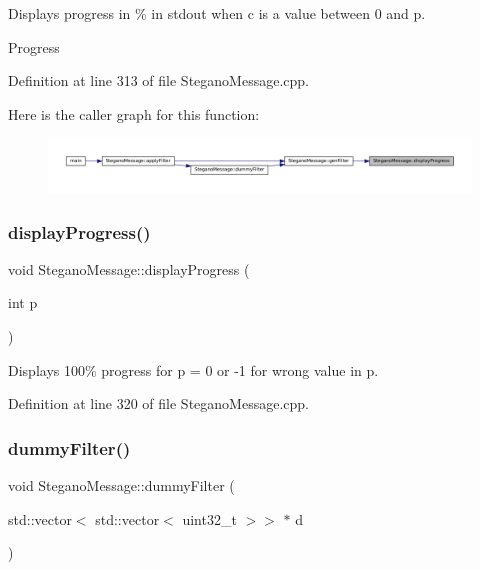 Displays progress in \% in stdout when c is a value between 0 and p. 

Progress 

Definition at line 313 of file Stegano\+Message.\+cpp.

Here is the caller graph for this function\+:\nopagebreak
\begin{figure}[H]
\begin{center}
\leavevmode
\includegraphics[width=350pt]{classSteganoMessage_a50936bb2352eaaa1112280c2ac3ca2d5_icgraph}
\end{center}
\end{figure}
\mbox{\label{classSteganoMessage_aa6e24f6ed5afcf38dcba28fb91a74d21}} 
\subsubsection{\texorpdfstring{displayProgress()}{displayProgress()}\hspace{0.1cm}{\footnotesize\ttfamily [2/2]}}
{\footnotesize\ttfamily void Stegano\+Message\+::display\+Progress (\begin{DoxyParamCaption}\item[{int}]{p }\end{DoxyParamCaption})\hspace{0.3cm}{\ttfamily [private]}}



Displays 100\% progress for p = 0 or -\/1 for wrong value in p. 



Definition at line 320 of file Stegano\+Message.\+cpp.

\mbox{\label{classSteganoMessage_a1a26242c2e6d146cba1ad6831ab60ba7}} 
\subsubsection{\texorpdfstring{dummyFilter()}{dummyFilter()}}
{\footnotesize\ttfamily void Stegano\+Message\+::dummy\+Filter (\begin{DoxyParamCaption}\item[{std\+::vector$<$ std\+::vector$<$ uint32\+\_\+t $>$$>$ $\ast$}]{d }\end{DoxyParamCaption})\hspace{0.3cm}{\ttfamily [private]}}



